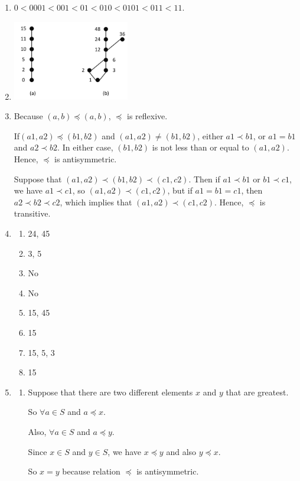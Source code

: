 \documentclass{sig-alternate-05-2015}
\begin{document}
\begin{enumerate}
\item $0 < 0001 < 001 < 01 < 010 < 0101 < 011 < 11$.

\item 
	\includegraphics[width=0.4\textwidth]{figs/252.pdf}
	
\item 
Because $(a, b)\preceq (a, b)$, $\preceq$ is reflexive. 

If$(a1, a2)\preceq (b1, b2)$ and $(a1, a2)\neq (b1, b2)$, either $a1\prec b1$, or
$a1 = b1$ and $a2 \prec b2$. In either case, $(b1, b2)$ is not less than or
equal to $(a1, a2)$. Hence, $\preceq$ is antisymmetric. 

Suppose that
$(a1, a2)\prec (b1, b2) \prec (c1, c2)$. Then if $a1\prec b1$ or $b1\prec c1$,
we have $a1 \prec c1$, so $(a1, a2) \prec (c1, c2)$, but if $a1 = b1 = c1$,
then $a2 \prec b2 \prec c2$, which implies that $(a1, a2) \prec (c1, c2)$.
Hence, $\preceq$ is transitive.

\item
\begin{enumerate}
	\item 24, 45 
	\item 3, 5
	\item No
	\item No
	\item 15, 45
	\item 15
	\item 15, 5, 3
	\item 15
\end{enumerate}

\item
	\begin{enumerate}
		\item Suppose that there are two different elements $x$ and $y$ that are greatest.
		
		So $\forall a \in S$ and $a\preceq x$. 
		
		Also, $\forall a \in S$ and $a\preceq y$. 
		
		Since $x \in S$ and $y\in S$, we have $x\preceq y$ and also $y \preceq x$. 
		
		So $x=y$ because relation $\preceq$ is antisymmetric.
		

\end{enumerate}
\end{enumerate}
\end{document}
